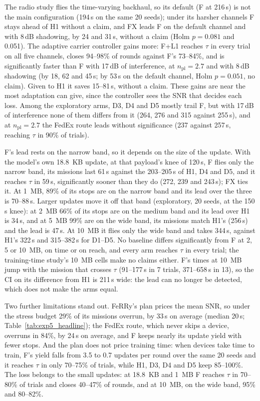 \documentclass[conference]{IEEEtran}
\begin{document}
The radio study
flies the time-varying backhaul, so its default (F at 216\,s) is not the main
configuration (194\,s on the same 20 seeds); under its harsher channels F stays ahead of H1 without a
claim, and FX leads F on the default channel and with 8\,dB shadowing, by 24 and
31\,s, without a claim (Holm $p=0.081$ and 0.051). The adaptive carrier controller
gains more: F+L1 reaches $\tau$ in every trial on all five channels, closes
94--98\% of rounds against F's 73--84\%, and is significantly faster than F with
17\,dB of interference, at $n_{\text{pl}}=2.7$ and with 8\,dB shadowing (by 18, 62
and 45\,s; by 53\,s on the default channel, Holm $p=0.051$, no claim). Given to H1
it saves 15--81\,s, without a claim. These gains are near the most adaptation can
give, since the controller sees the SNR that decides each loss. Among the exploratory arms, D3, D4 and D5 mostly trail F, but
with 17\,dB of interference none of them differs from it (264, 276 and 315
against 255\,s), and at $n_{\text{pl}}=2.7$ the FedEx route leads without
significance (237 against 257\,s, reaching $\tau$ in 90\% of trials).

F's lead rests on the narrow band, so it depends on the size of the update. With
the model's own 18.8~KB update, at that payload's knee of 120\,s, F flies only
the narrow band, its missions last 61\,s against the 203--205\,s of H1, D4 and
D5, and it reaches $\tau$ in 59\,s, significantly sooner than they do (272, 239
and 243\,s); FX ties it. At 1~MB, 89\% of its stops are on the narrow band and
its lead over the three is 70--88\,s. Larger updates move it off that band
(exploratory, 20 seeds, at the 150\,s knee): at 2~MB 66\% of its stops are on the
medium band and its lead over H1 is 34\,s, and at 5~MB 99\% are on the wide band,
its missions match H1's (256\,s) and the lead is 47\,s. At 10~MB it flies only
the wide band and takes 344\,s, against H1's 322\,s and 315--382\,s for D1--D5.
No baseline differs significantly from F at 2, 5 or 10~MB, on time or on reach,
and every arm reaches $\tau$ in every trial; the training-time study's 10~MB
cells make no claims either. F's times at 10~MB jump with the mission that
crosses $\tau$ (91--177\,s in 7 trials, 371--658\,s in 13), so the CI on its
difference from H1 is 211\,s wide: the lead can no longer be detected, which does
not make the arms equal.

Two further limitations stand out. FeRRy's plan prices the mean SNR, so
under the stress budget 29\% of its missions overrun, by 33\,s on average
(median 20\,s; Table~\ref{tab:exp5_headline}); the FedEx route, which never skips
a device, overruns in 84\%, by 24\,s on average, and F keeps nearly its update
yield with fewer stops. And the
plan does not price training time: when devices take time to train, F's yield
falls from 3.5 to 0.7 updates per round over the same 20 seeds and it reaches $\tau$ in only 70--75\% of
trials, while H1, D3, D4 and D5 keep 85--100\%. The loss belongs to the small
updates: at 18.8~KB and 1~MB F reaches $\tau$ in 70--80\% of trials and closes
40--47\% of rounds, and at 10~MB, on the wide band, 95\% and 80--82\%.
\end{document}
